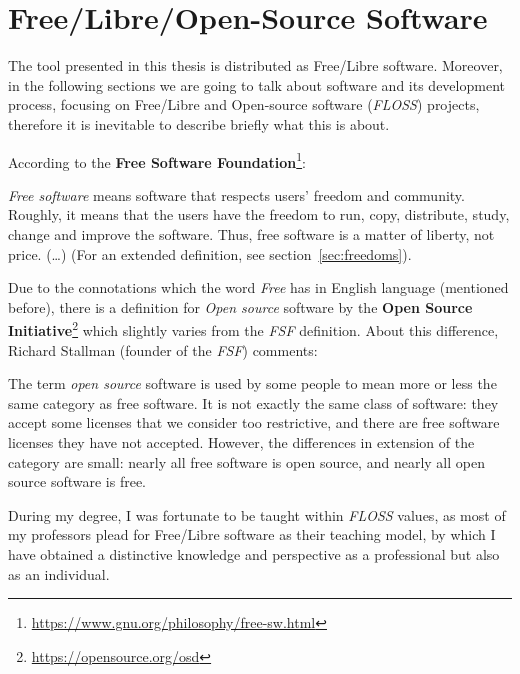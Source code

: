 \documentclass[a4paper, 12pt]{book}
\begin{document}
\section{Free/Libre/Open-Source Software}
\label{sec:floss-definition}
The tool presented in this thesis is distributed as Free/Libre software. Moreover, in the following sections we are going
to talk about software and its development process, focusing on Free/Libre and Open-source
software (\emph{FLOSS}) projects, therefore it is inevitable to describe briefly what this is about.\par
According to the \textbf{Free Software Foundation}\footnote{\url{https://www.gnu.org/philosophy/free-sw.html}}:
\begin{displayquote}
    \emph{Free software} means software that respects users' freedom and community. Roughly, it means that the users have the freedom
    to run, copy, distribute, study, change and improve the software. Thus, free software is a matter of liberty, not price. (\ldots)
    (For an extended definition, see section~\ref{sec:freedoms}).\\
\end{displayquote}
Due to the connotations which the word \emph{Free} has in English language (mentioned before), there is a definition
for \emph{Open source} software by the \textbf{Open Source Initiative}\footnote{\url{https://opensource.org/osd}} which
slightly varies from the \emph{FSF} definition. About this difference, Richard Stallman (founder of the \emph{FSF}) comments:
\begin{displayquote}
The term \emph{open source} software is used by some people to mean more or less the same category as free software.
It is not exactly the same class of software: they accept some licenses that we consider too restrictive,
and there are free software licenses they have not accepted. However, the differences in extension of the
category are small: nearly all free software is open source, and nearly all open source software is free.
\end{displayquote}
During my degree, I was fortunate to be taught within \emph{FLOSS} values, as most of my professors plead
for Free/Libre software as their teaching model, by which I have obtained a distinctive knowledge and perspective
as a professional but also as an individual.
\end{document}
